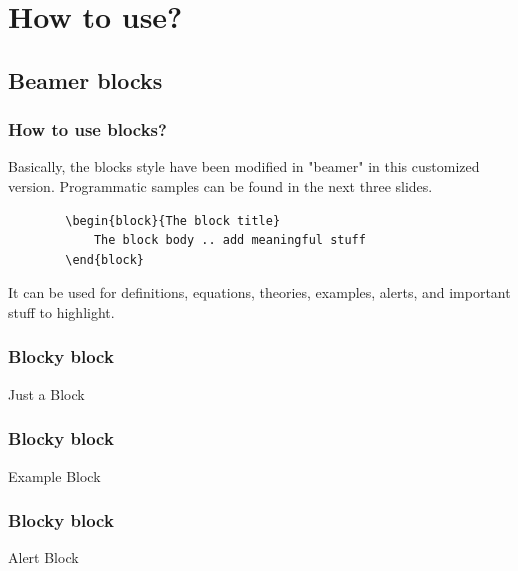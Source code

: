 \documentclass{EESD}
\begin{document}
\section{How to use?}

\subsection{Beamer blocks}
\begin{frame}[fragile]
\frametitle{How to use blocks?}
    Basically, the blocks style have been modified in "beamer" in this customized version. Programmatic samples can be found in the next three slides.
    \vspace{10pt}
    \begin{lstlisting}
        \begin{block}{The block title}
            The block body .. add meaningful stuff
        \end{block}
    \end{lstlisting}
    \vspace{10pt}
    It can be used for definitions, equations, theories, examples, alerts, and important stuff to highlight.
\end{frame}

\begin{frame}
\frametitle{Blocky block}
\begin{block}{Just a Block}
\lipsum[1]
\end{block}
\end{frame}

\begin{frame}
\frametitle{Blocky block}
\begin{exampleblock}{Example Block}
\lipsum[1]
\end{exampleblock}
\end{frame}

\begin{frame}
\frametitle{Blocky block}
\begin{alertblock}{Alert Block}
\lipsum[1]
\end{alertblock}
\end{frame}
\end{document}
